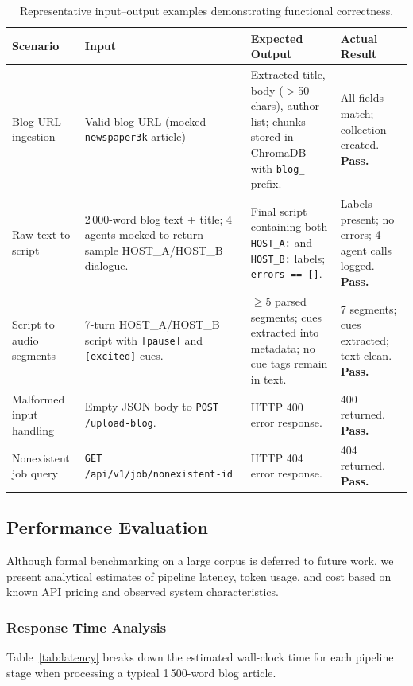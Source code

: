 \documentclass[sigconf,natbib=false]{acmart}   %
\begin{document}
\begin{table}[H]
\centering
\small
\begin{tabular}{p{2.8cm}p{3.5cm}p{4.2cm}p{3.0cm}}
\toprule
\textbf{Scenario} & \textbf{Input} & \textbf{Expected Output} & \textbf{Actual Result}\\
\midrule
Blog URL ingestion & Valid blog URL (mocked \texttt{newspaper3k} article) & Extracted title, body ($>$50 chars), author list; chunks stored in ChromaDB with \texttt{blog\_} prefix. & All fields match; collection created. \textbf{Pass.}\\
\hline
Raw text to script & 2\,000-word blog text + title; 4 agents mocked to return sample HOST\_A/HOST\_B dialogue. & Final script containing both \texttt{HOST\_A:} and \texttt{HOST\_B:} labels; \texttt{errors == []}. & Labels present; no errors; 4 agent calls logged. \textbf{Pass.}\\
\hline
Script to audio segments & 7-turn HOST\_A/HOST\_B script with \texttt{[pause]} and \texttt{[excited]} cues. & $\ge$5 parsed segments; cues extracted into metadata; no cue tags remain in text. & 7 segments; cues extracted; text clean. \textbf{Pass.}\\
\hline
Malformed input handling & Empty JSON body to \texttt{POST /upload-blog}. & HTTP 400 error response. & 400 returned. \textbf{Pass.}\\
\hline
Nonexistent job query & \texttt{GET /api/v1/job/nonexistent-id} & HTTP 404 error response. & 404 returned. \textbf{Pass.}\\
\bottomrule
\end{tabular}
\caption{Representative input--output examples demonstrating functional correctness.}
\label{tab:io_examples}
\end{table}

\subsection{Performance Evaluation}
Although formal benchmarking on a large corpus is deferred to future work, we present analytical estimates of pipeline latency, token usage, and cost based on known API pricing and observed system characteristics.

\subsubsection{Response Time Analysis}
Table~\ref{tab:latency} breaks down the estimated wall-clock time for each pipeline stage when processing a typical 1\,500-word blog article.
\end{document}
